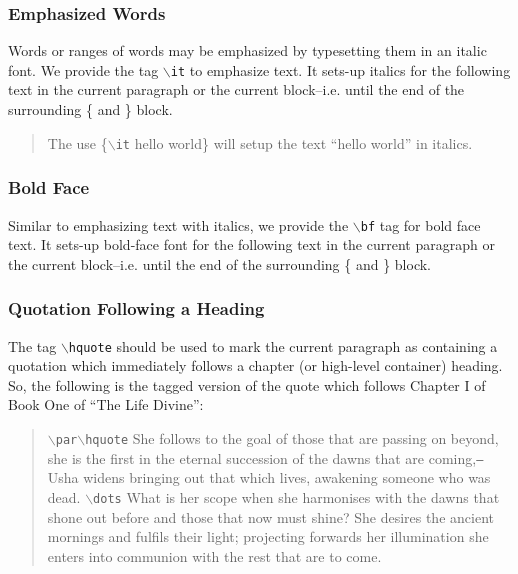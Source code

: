 \documentclass[11pt]{article}
\newcommand{\cmd}[1]{{\tt $\backslash$#1}}
\begin{document}
\subsubsection{Emphasized Words}

Words or ranges of words may be emphasized by typesetting them in an
italic font. We provide the tag \cmd{it} to emphasize text. It sets-up
italics for the following text in the current paragraph or the current
block--i.e. until the end of the surrounding \{ and \} block.

\begin{quote}
  The use \{\cmd{it} hello world\} will setup the text ``hello world''
  in italics.
\end{quote}





\subsubsection{Bold Face}

Similar to emphasizing text with italics, we provide the \cmd{bf} tag
for bold face text.  It sets-up bold-face font for the following text
in the current paragraph or the current block--i.e. until the end of
the surrounding \{ and \} block.


\subsubsection{Quotation Following a Heading}

The tag \cmd{hquote} should be used to mark the current paragraph as
containing a quotation which immediately follows a chapter (or
high-level container) heading. So, the following is the tagged version
of the quote which follows Chapter I of Book One of ``The Life Divine'':

\begin{quote}
  \cmd{par}\cmd{hquote} She follows to the goal of those that are
  passing on beyond, she is the first in the eternal succession of the
  dawns that are coming,{\tt ---}Usha widens bringing out that which lives,
  awakening someone who was dead. \cmd{dots} What is her scope when she
  harmonises with the dawns that shone out before and those that now
  must shine? She desires the ancient mornings and fulfils their
  light; projecting forwards her illumination she enters into
  communion with the rest that are to come.
\end{quote}
\end{document}
